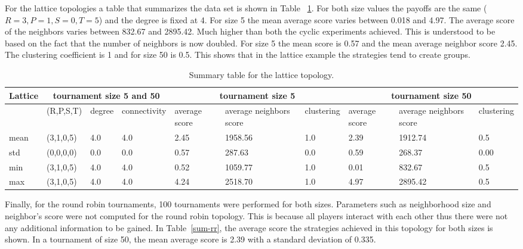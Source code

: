 For the lattice topologies a table that summarizes the data set is shown in Table
~\ref{sum-lattice}. For both size values the payoffs are the same (\(R=3, P=1, S=0, T=5\))
and the degree is fixed at 4. For size 5 the mean average score
varies between 0.018 and 4.97. The average score of the neighbors varies between
832.67 and 2895.42. Much higher than both the cyclic experiments achieved. This
is understood to be based on the fact that the number of neighbors is now doubled.
For size 5 the mean score is 0.57 and the mean average neighbor score 2.45.
The clustering coefficient is 1 and for size 50 is 0.5.
This shows that in the lattice example the strategies tend to create groups.

\begin{table}[!hbtp]
\centering
\begin{adjustbox}{width=1\textwidth}
\small
\begin{tabular}{@{}|l|l|l|l|l|l|l|l|l|l|@{}}
\toprule
Lattice & \multicolumn{3}{c|}{tournament size 5 and 50} & \multicolumn{3}{c|}{tournament size 5} & \multicolumn{3}{c|}{tournament size 50}                            \\ \midrule
       & (R,P,S,T) & degree & connectivity & average score & average neighbors score & clustering & average score & average neighbors score & clustering \\ \midrule
mean   & (3,1,0,5) & 4.0    & 4.0          & 2.45      & 1958.56           & 1.0        & 2.39      & 1912.74             & 0.5        \\ \midrule
std    & (0,0,0,0) & 0.0    & 0.0          & 0.57      & 287.63            & 0.0        & 0.59      & 268.37              & 0.00       \\ \midrule
min    & (3,1,0,5) & 4.0    & 4.0          & 0.52      & 1059.77           & 1.0        & 0.01      & 832.67              & 0.5        \\ \midrule
max    & (3,1,0,5) & 4.0    & 4.0          & 4.24     & 2518.70            & 1.0        & 4.97      & 2895.42             & 0.5        \\ \bottomrule
\end{tabular}
\end{adjustbox}
\caption{Summary table for the lattice topology.}
\label{sum-lattice}
\end{table}

\newpage

Finally, for the round robin tournaments, 100 tournaments were performed for both
sizes. Parameters such as neighborhood size and neighbor's score
were not computed for the round robin topology. This is because all players
interact with each other thus there were not any additional information to be
gained. In Table~\ref{sum-rr}, the average score the strategies achieved
in this topology for both sizes is shown. In a tournament of size 50, the mean average
score is 2.39 with a standard deviation of 0.335.

